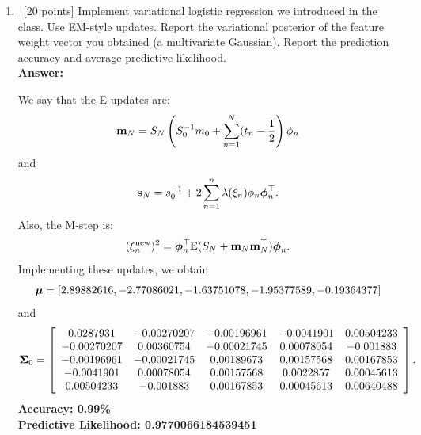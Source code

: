 \documentclass[12pt, fullpage,letterpaper]{article}
\def\red{\color{black!30!red}}
\def\blackblue{\color{black!40!blue}}
\begin{document}
\begin{enumerate}
\begin{enumerate}
{}
		\item~[20 points] Implement variational logistic regression we introduced in the class. Use EM-style updates. Report the variational posterior of the feature weight vector you obtained (\ie a multivariate Gaussian). Report the prediction accuracy and average predictive likelihood. \\
{\bf \red Answer: }{\blackblue 
We say that the E-updates are:
$${\bf m}_N = S_N\left(S_0^{-1}m_0 + \sum\limits_{n=1}^N(t_n-\frac{1}{2}\right)\phi_n$$
and 
$${\bf s}_N = s_0^{-1}+2\sum\limits_{n=1}^n\lambda(\xi_n) \phi_n\boldsymbol{\phi}_n^\top.$$
Also, the M-step is:
$$(\xi_n^{\rm new})^2 = \boldsymbol{\phi}_n^\top\mathbb{E}(S_N+{\bf m}_N{\bf m}_N^\top)\boldsymbol{\phi}_n.$$
Implementing these updates, we obtain
$$\boldsymbol{\mu} = [ 2.89882616, -2.77086021, -1.63751078, -1.95377589, -0.19364377]$$
and 
$$\boldsymbol{\Sigma}_0 = \left[\begin{array}{ccccc}
0.0287931 & -0.00270207 & -0.00196961 & -0.0041901 &  0.00504233\\
-0.00270207 &  0.00360754 & -0.00021745 &  0.00078054 & -0.001883 \\
-0.00196961 & -0.00021745 &  0.00189673 &  0.00157568 &  0.00167853\\
 -0.0041901  &  0.00078054 &  0.00157568 &  0.0022857 &  0.00045613\\
0.00504233  & -0.001883  &  0.00167853 &  0.00045613 &  0.00640488
\end{array}\right].$$
{\bf Accuracy: 0.99\%}\\
{\bf Predictive Likelihood: 0.9770066184539451}




}
\end{enumerate}
\end{enumerate}
\end{document}

